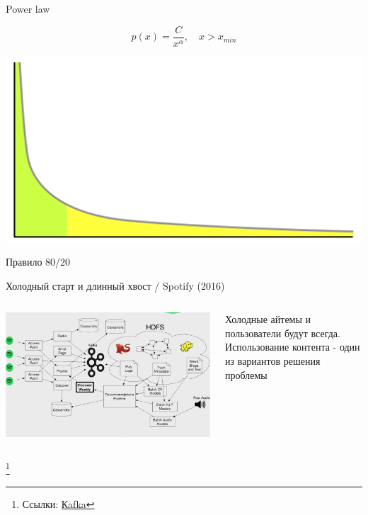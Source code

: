\documentclass[11pt,aspectratio=169,handout]{beamer}
\begin{document}
\begin{frame}{Power law}

\[
p(x) = \frac{C} {x^{\alpha}}, \quad x > x_{min}
\]

\begin{center}
\includegraphics[scale=0.25]{images/longtail.png}

Правило 80/20
\end{center}

\end{frame}

\begin{frame}{Холодный старт и длинный хвост / Spotify (2016) \cite{SPTF}}
\begin{columns}
\begin{column}{0.6\textwidth}
   \begin{center}
		\includegraphics[scale=0.31]{images/spotify.jpeg}
   \end{center}
\end{column}
\begin{column}{0.35\textwidth}
\begin{small}
    \begin{tcolorbox}[colback=info!5,colframe=info!80,title=]
    Холодные айтемы и пользователи будут всегда. Использование контента - один из вариантов решения проблемы
    \end{tcolorbox}
\end{small}
\end{column}
\end{columns}

\footnote{Ссылки:
\href{https://kafka.apache.org/}{Кafka}
}

\end{frame}
\end{document}
